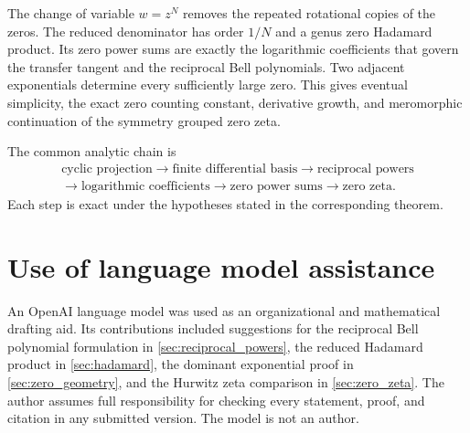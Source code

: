 \documentclass{aomart}
\theoremstyle{definition}
\theoremstyle{remark}
\begin{document}
The change of variable $w=z^N$ removes the repeated rotational copies of the zeros.  The reduced denominator has order $1/N$ and a genus zero Hadamard product.  Its zero power sums are exactly the logarithmic coefficients that govern the transfer tangent and the reciprocal Bell polynomials.  Two adjacent exponentials determine every sufficiently large zero.  This gives eventual simplicity, the exact zero counting constant, derivative growth, and meromorphic continuation of the symmetry grouped zero zeta.

The common analytic chain is
\[
\begin{gathered}
\text{cyclic projection}
\longrightarrow
\text{finite differential basis}
\longrightarrow
\text{reciprocal powers}
\\
\longrightarrow
\text{logarithmic coefficients}
\longrightarrow
\text{zero power sums}
\longrightarrow
\text{zero zeta}.
\end{gathered}
\]
Each step is exact under the hypotheses stated in the corresponding theorem.

\section*{Use of language model assistance}
An OpenAI language model was used as an organizational and mathematical drafting aid.  Its contributions included suggestions for the reciprocal Bell polynomial formulation in \cref{sec:reciprocal_powers}, the reduced Hadamard product in \cref{sec:hadamard}, the dominant exponential proof in \cref{sec:zero_geometry}, and the Hurwitz zeta comparison in \cref{sec:zero_zeta}.  The author assumes full responsibility for checking every statement, proof, and citation in any submitted version.  The model is not an author.



\end{document}
